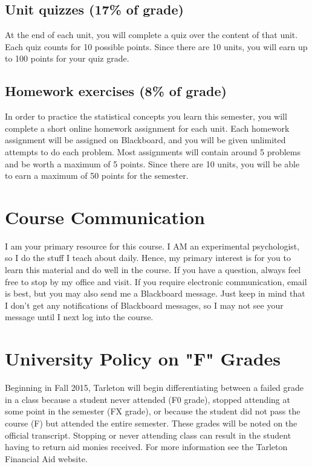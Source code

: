 \documentclass[10pt]{article}
\begin{document}
\subsection*{Unit quizzes (17\% of grade)}
\label{sec-5-2}
At the end of each unit, you will complete a quiz over the content of that 
unit. Each quiz counts for 10 possible points.  Since there are 10 units, 
you will earn up to 100 points for your quiz grade.

\subsection*{Homework exercises (8\% of grade)}
\label{sec-5-3}
In order to practice the statistical concepts you learn this semester, you
will complete a short online homework assignment for each unit.  Each 
homework assignment will be assigned on Blackboard, and you will be given
unlimited attempts to do each problem.  Most assignments will contain 
around 5 problems and be worth a maximum of 5 points.  Since there are 10
units, you will be able to earn a maximum of 50 points for the semester.

\section*{Course Communication}
\label{sec-6}

I am your primary resource for this course. I AM an experimental psychologist, so I do the stuff I teach about daily. Hence, my primary interest is for you to learn this material and do well in the course. If you have a question, always feel free to stop by my office and visit.  If you require electronic communication, email is best, but you may also send me a Blackboard message.  Just keep in mind that I don't get any notifications of Blackboard messages, so I may not see your message until I next log into the course.

\section*{University Policy on "F" Grades}
\label{sec-7}
Beginning in Fall 2015, Tarleton will begin differentiating between a 
failed grade in a class because a student never attended (F0 grade), 
stopped attending at some point in the semester (FX grade), or because 
the student did not pass the course (F) but attended the entire semester. 
These grades will be noted on the official transcript. Stopping or never 
attending class can result in the student having to return aid monies 
received.  For more information see the Tarleton Financial Aid website.
\end{document}
